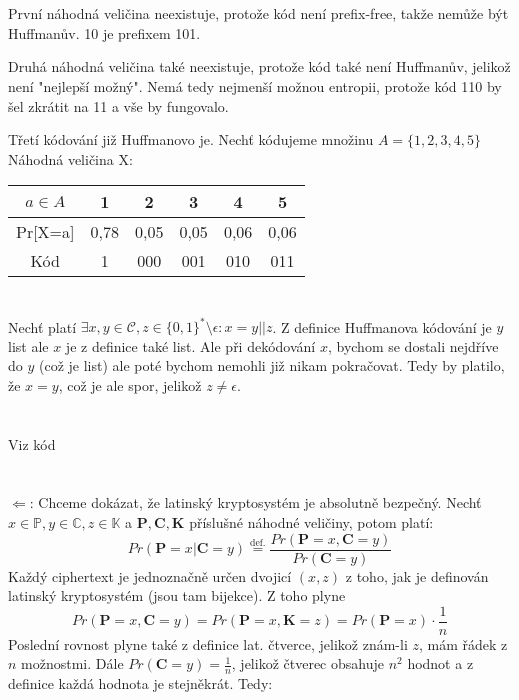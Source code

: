 \documentclass[12pt, a4paper]{article}
\begin{document}
\section{}
První náhodná veličina neexistuje, protože kód není prefix-free, takže nemůže být Huffmanův. 10 je prefixem 101.

Druhá náhodná veličina také neexistuje, protože kód také není Huffmanův, jelikož není "nejlepší možný". Nemá tedy nejmenší možnou entropii, protože kód 110 by šel zkrátit na 11 a vše by fungovalo.

Třetí kódování již Huffmanovo je. Nechť kódujeme množinu $A = \{1,2,3,4,5\}$  Náhodná veličina X: 
\begin{center}
\begin{tabular}{ |c|c|c|c|c|c| } 
\hline
$a \in A$ &1 & 2 & 3 & 4 & 5\\ 
\hline
Pr[X=a] & 0,78 & 0,05 & 0,05 & 0,06 & 0,06\\ 
\hline
Kód & 1 & 000 & 001 & 010 & 011\\ 
\hline
\end{tabular}
\end{center}

\section{}
Nechť platí $\exists x,y \in \mathcal{C}, z \in \{0,1\}^* \setminus \epsilon : x=y||z$. Z definice Huffmanova kódování je $y$ list ale $x$ je z definice také list. Ale při dekódování $x$, bychom se dostali nejdříve do $y$ (což je list) ale poté bychom nemohli již nikam pokračovat. Tedy by platilo, že $x=y$, což je ale spor, jelikož $z \neq \epsilon$.

\section{}
Viz kód

\section{}
$\Leftarrow$: Chceme dokázat, že latinský kryptosystém je absolutně bezpečný. Nechť $x \in \mathbb{P}, y \in \mathbb{C}, z \in \mathbb{K}$ a $\mathbf{P},\mathbf{C},\mathbf{K}$ příslušné náhodné veličiny, potom platí: 
\[
Pr(\mathbf{P}=x \vert \mathbf{C}=y) \stackrel{\text{def.}}{=} \frac{Pr(\mathbf{P}=x, \mathbf{C}=y) }{Pr(\mathbf{C}=y) }
\]
Každý ciphertext je jednoznačně určen dvojicí $(x,z)$ z toho, jak je definován latinský kryptosystém (jsou tam bijekce). Z toho plyne 
$$Pr(\mathbf{P}=x, \mathbf{C}=y) = Pr(\mathbf{P}=x, \mathbf{K}=z) = Pr(\mathbf{P}=x) \cdot \frac{1}{n}$$
Poslední rovnost plyne také z definice lat. čtverce, jelikož znám-li $z$, mám řádek z $n$ možnostmi. Dále $ Pr(\mathbf{C}=y) = \frac{1}{n}$, jelikož čtverec obsahuje $n^2$ hodnot a z definice každá hodnota je stejněkrát. Tedy:
\end{document}
